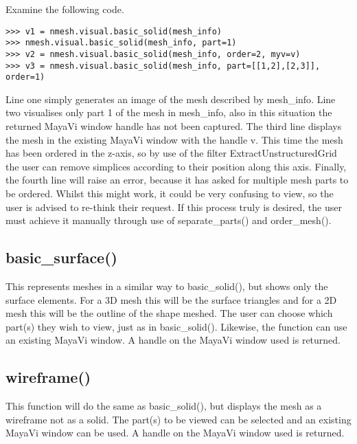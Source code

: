 Examine the following code.
\begin{lstlisting}[basicstyle=\small\ttfamily]
>>> v1 = nmesh.visual.basic_solid(mesh_info)
>>> nmesh.visual.basic_solid(mesh_info, part=1)
>>> v2 = nmesh.visual.basic_solid(mesh_info, order=2, myv=v)
>>> v3 = nmesh.visual.basic_solid(mesh_info, part=[[1,2],[2,3]], order=1)
\end{lstlisting}
Line one simply generates an image of the mesh described by {\ttfamily mesh\_info}. Line two visualises only part 1 of the mesh in {\ttfamily mesh\_info}, also in this situation the returned MayaVi window handle has not been captured. The third line displays the mesh in the existing MayaVi window with the handle {\ttfamily v}. This time the mesh has been ordered in the z-axis, so by use of the filter ExtractUnstructuredGrid the user can remove simplices according to their position along this axis. Finally, the fourth line will raise an error, because it has asked for multiple mesh parts to be ordered. Whilst this might work, it could be very confusing to view, so the user is advised to re-think their request. If this process truly is desired, the user must achieve it manually through use of {\ttfamily separate\_parts()} and {\ttfamily order\_mesh()}.


\subsection{{\ttfamily basic\_surface()}}
This represents meshes in a similar way to {\ttfamily basic\_solid()}, but shows only the surface elements. For a 3D mesh this will be the surface triangles and for a 2D mesh this will be the outline of the shape meshed. The user can choose which part(s) they wish to view, just as in {\ttfamily basic\_solid()}. Likewise, the function can use an existing MayaVi window. A handle on the MayaVi window used is returned.


\subsection{{\ttfamily wireframe()}}
This function will do the same as {\ttfamily basic\_solid()}, but displays the mesh as a wireframe not as a solid. The part(s) to be viewed can be selected and an existing MayaVi window can be used. A handle on the MayaVi window used is returned.



